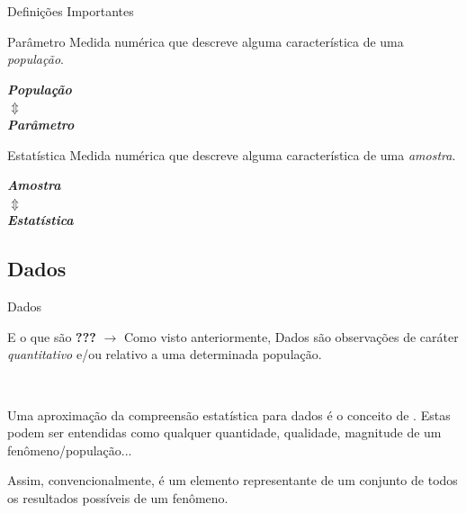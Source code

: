 \documentclass{bredelebeamer}
\begin{document}
\begin{frame}{Definições Importantes}

\begin{alertblock}{Parâmetro}
Medida numérica que descreve alguma característica de uma \emph{população}.

\vspace{.1cm}

\begin{center}
\textbf{\emph{População}} \\
\textbf{\emph{$\Updownarrow$}} \\
\textbf{\emph{Parâmetro}} 
\end{center}
\end{alertblock}

\begin{alertblock}{Estatística}
Medida numérica que descreve alguma característica de uma \emph{amostra}.

\vspace{.1cm}

\begin{center}
\textbf{\emph{Amostra}} \\
\textbf{\emph{$\Updownarrow$}} \\
\textbf{\emph{Estatística}} 
\end{center}
\end{alertblock}

\end{frame}

\subsection{Dados}

\begin{frame}{Dados}

\begin{exampleblock}{E o que são \textbf{???}}
$\rightarrow$ Como visto anteriormente, Dados são observações de caráter
\textit{\emph{quantitativo}} e/ou \textbf{\textit{}}
relativo a uma determinada população.\\

\vspace{.5cm}

 \\

\vspace{.5cm}

Uma aproximação da compreensão estatística para dados é o conceito de
. Estas podem ser entendidas como qualquer quantidade,
qualidade, magnitude de um fenômeno/população...\\

\vspace{.5cm}

Assim, convencionalmente,  é um elemento representante
de um conjunto de todos os resultados possíveis de um fenômeno. 
\end{exampleblock}

\end{frame}
\end{document}

